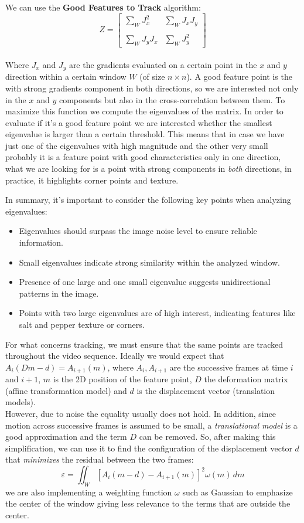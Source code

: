 We can use the \textbf{Good Features to Track} algorithm:
\[
    Z = \begin{bmatrix}
        \sum_{W}^{}J_x^2 & \sum_{W}^{}J_xJ_y \\
        \\
        \sum_{W}^{}J_yJ_x & \sum_{W}^{}J_y^2
    \end{bmatrix}
\]
\\Where $J_x$ and $J_y$ are the gradients evaluated on a certain point in the $x$ and $y$ direction within a certain window $W$ (of size $n\times n$). 
A good feature point is the with strong gradients component in both directions, so we are interested not only in the \(x\) and \(y\) components but also in the cross-correlation between them. To maximize this function we compute the eigenvalues of the matrix. In order to evaluate if it's a good feature point we are interested whether the smallest eigenvalue is larger than a certain threshold. This means that in case we have just one of the eigenvalues with high magnitude and the other very small probably it is a feature point with good characteristics only in one direction, what we are looking for is a point with strong components in \textit{both} directions, in practice, it highlights corner points and texture.

In summary, it's important to consider the following key points when analyzing eigenvalues:
\begin{itemize}
    \item Eigenvalues should surpass the image noise level to ensure reliable information.
    \item Small eigenvalues indicate strong similarity within the analyzed window.
    \item Presence of one large and one small eigenvalue suggests unidirectional patterns in the image.
    \item Points with two large eigenvalues are of high interest, indicating features like salt and pepper texture or corners.
\end{itemize}

For what concerns tracking, we must ensure that the same points are tracked throughout the video sequence. 
Ideally we would expect that $A_i(Dm-d)=A_{i+1}(m)$, where $A_i, A_{i+1}$ are the successive frames at time $i$ and $i+1$, $m$ is the 2D position of the feature point, $D$ the deformation matrix (affine transformation model) and $d$ is the displacement vector (translation models).
\\ However, due to noise the equality usually does not hold. In addition, since motion across successive frames is assumed to be small, a \textit{translational model} is a good approximation and the term $D$ can be removed. So, after making this simplification, we can use it to find the configuration of the displacement vector $d$ that \textit{minimizes} the residual between the two frames:
\[
    \varepsilon = \iint_{W} \left[A_i(m-d)-A_{i+1}(m)\right]^2 \omega(m) \, dm
\]
we are also implementing a weighting function $\omega$ such as Gaussian to emphasize the center of the window giving less relevance to the terms that are outside the center.

